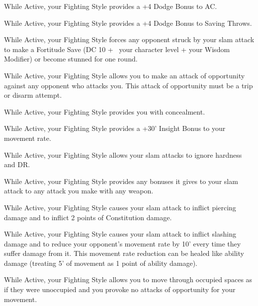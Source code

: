 \begin{awesomelist}
    \item{While Active, your Fighting Style provides a +4 Dodge Bonus to AC.}
    \item{While Active, your Fighting Style provides a +4 Dodge Bonus to Saving Throws.}
    \item{While Active, your Fighting Style forces any opponent struck by your slam attack to make a Fortitude Save (DC 10 + \half\  your character level + your Wisdom Modifier) or become stunned for one round.}
    \item{While Active, your Fighting Style allows you to make an attack of opportunity against any opponent who attacks you. This attack of opportunity must be a trip or disarm attempt.}
    \item{While Active, your Fighting Style provides you with concealment.}
    \item{While Active, your Fighting Style provides a +30' Insight Bonus to your movement rate.}
    \item{While Active, your Fighting Style allows your slam attacks to ignore hardness and DR.}
    \item{While Active, your Fighting Style provides any bonuses it gives to your slam attack to any attack you make with any weapon.}
    \item{While Active, your Fighting Style causes your slam attack to inflict piercing damage and to inflict 2 points of Constitution damage.}
    \item{While Active, your Fighting Style causes your slam attack to inflict slashing damage and to reduce your opponent's movement rate by 10' every time they suffer damage from it. This movement rate reduction can be healed like ability damage (treating 5' of movement as 1 point of ability damage).}
    \item{While Active, your Fighting Style allows you to move through occupied spaces as if they were unoccupied and you provoke no attacks of opportunity for your movement.}
\end{awesomelist}


